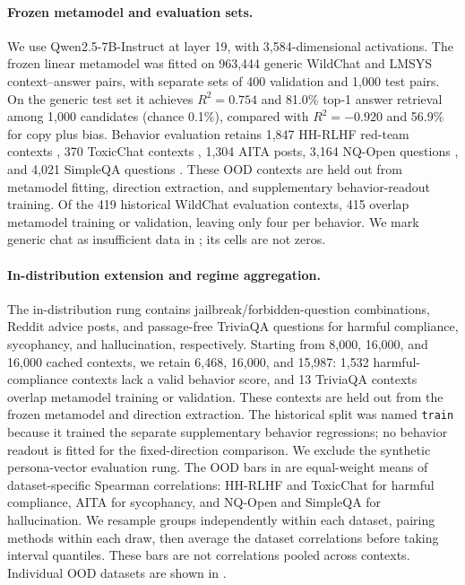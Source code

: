\paragraph{Frozen metamodel and evaluation sets.} We use Qwen2.5-7B-Instruct at layer 19, with 3,584-dimensional activations. The frozen linear metamodel was fitted on 963,444 generic WildChat and LMSYS context--answer pairs, with separate sets of 400 validation and 1,000 test pairs. On the generic test set it achieves $R^2=0.754$ and 81.0\% top-1 answer retrieval among 1,000 candidates (chance 0.1\%), compared with $R^2=-0.920$ and 56.9\% for copy plus bias. Behavior evaluation retains 1,847 HH-RLHF red-team contexts \citep{ganguli2022redteaming}, 370 ToxicChat contexts \citep{lin2023toxicchat}, 1,304 AITA posts, 3,164 NQ-Open questions \citep{kwiatkowski2019nq,lee2019latent}, and 4,021 SimpleQA questions \citep{wei2024simpleqa}. These OOD contexts are held out from metamodel fitting, direction extraction, and supplementary behavior-readout training. Of the 419 historical WildChat evaluation contexts, 415 overlap metamodel training or validation, leaving only four per behavior. We mark generic chat as insufficient data in ; its cells are not zeros.

\paragraph{In-distribution extension and regime aggregation.} The in-distribution rung contains jailbreak/forbidden-question combinations, Reddit advice posts, and passage-free TriviaQA questions for harmful compliance, sycophancy, and hallucination, respectively. Starting from 8,000, 16,000, and 16,000 cached contexts, we retain 6,468, 16,000, and 15,987: 1,532 harmful-compliance contexts lack a valid behavior score, and 13 TriviaQA contexts overlap metamodel training or validation. These contexts are held out from the frozen metamodel and direction extraction. The historical split was named \texttt{train} because it trained the separate supplementary behavior regressions; no behavior readout is fitted for the fixed-direction comparison. We exclude the synthetic persona-vector evaluation rung. The OOD bars in  are equal-weight means of dataset-specific Spearman correlations: HH-RLHF and ToxicChat for harmful compliance, AITA for sycophancy, and NQ-Open and SimpleQA for hallucination. We resample groups independently within each dataset, pairing methods within each draw, then average the dataset correlations before taking interval quantiles. These bars are not correlations pooled across contexts. Individual OOD datasets are shown in .

